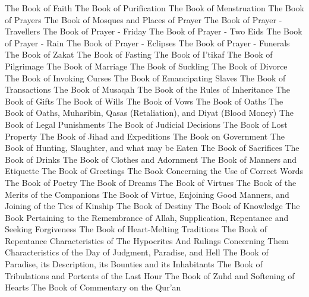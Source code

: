 









The Book of Faith
The Book of Purification
The Book of Menstruation
The Book of Prayers
The Book of Mosques and Places of Prayer
The Book of Prayer - Travellers
The Book of Prayer - Friday
The Book of Prayer - Two Eids
The Book of Prayer - Rain
The Book of Prayer - Eclipses
The Book of Prayer - Funerals
The Book of Zakat
The Book of Fasting
The Book of I'tikaf
The Book of Pilgrimage
The Book of Marriage
The Book of Suckling
The Book of Divorce
The Book of Invoking Curses
The Book of Emancipating Slaves
The Book of Transactions
The Book of Musaqah
The Book of the Rules of Inheritance
The Book of Gifts
The Book of Wills
The Book of Vows
The Book of Oaths
The Book of Oaths, Muharibin, Qasas (Retaliation), and Diyat (Blood Money)
The Book of Legal Punishments
The Book of Judicial Decisions
The Book of Lost Property
The Book of Jihad and Expeditions
The Book on Government
The Book of Hunting, Slaughter, and what may be Eaten
The Book of Sacrifices
The Book of Drinks
The Book of Clothes and Adornment
The Book of Manners and Etiquette
The Book of Greetings
The Book Concerning the Use of Correct Words
The Book of Poetry
The Book of Dreams
The Book of Virtues
The Book of the Merits of the Companions
The Book of Virtue, Enjoining Good Manners, and Joining of the Ties of Kinship
The Book of Destiny
The Book of Knowledge
The Book Pertaining to the Remembrance of Allah, Supplication, Repentance and Seeking Forgiveness
The Book of Heart-Melting Traditions
The Book of Repentance
Characteristics of The Hypocrites And Rulings Concerning Them
Characteristics of the Day of Judgment, Paradise, and Hell
The Book of Paradise, its Description, its Bounties and its Inhabitants
The Book of Tribulations and Portents of the Last Hour
The Book of Zuhd and Softening of Hearts
The Book of Commentary on the Qur'an

















































